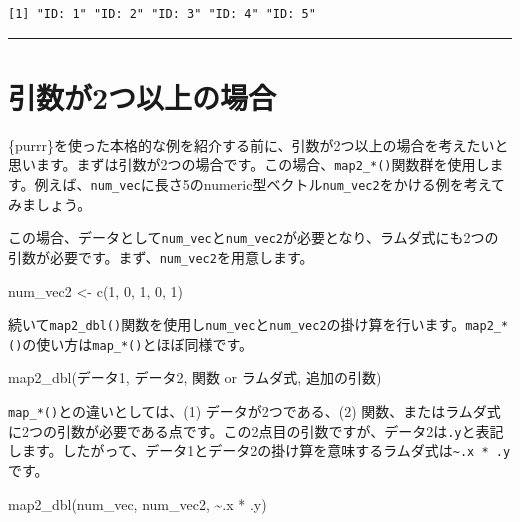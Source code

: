 \documentclass[
  a4paper,
  pandoc,
  ja=standard,
  jafont=haranoaji]{bxjsbook}
\newenvironment{Shaded}{\begin{snugshade}}{\end{snugshade}}
\newcommand{\DecValTok}[1]{\textcolor[rgb]{0.68,0.00,0.00}{#1}}
\newcommand{\FunctionTok}[1]{\textcolor[rgb]{0.28,0.35,0.67}{#1}}
\newcommand{\NormalTok}[1]{\textcolor[rgb]{0.00,0.48,0.65}{#1}}
\newcommand{\OtherTok}[1]{\textcolor[rgb]{0.00,0.48,0.65}{#1}}
\newcommand{\SpecialCharTok}[1]{\textcolor[rgb]{0.37,0.37,0.37}{#1}}
\begin{document}
\begin{verbatim}
[1] "ID: 1" "ID: 2" "ID: 3" "ID: 4" "ID: 5"
\end{verbatim}

\begin{center}\rule{0.5\linewidth}{0.5pt}\end{center}

\hypertarget{sec-iteration_two_arguments}{%
\section{引数が2つ以上の場合}\label{sec-iteration_two_arguments}}

\{purrr\}を使った本格的な例を紹介する前に、引数が2つ以上の場合を考えたいと思います。まずは引数が2つの場合です。この場合、\texttt{map2\_*()}関数群を使用します。例えば、\texttt{num\_vec}に長さ5のnumeric型ベクトル\texttt{num\_vec2}をかける例を考えてみましょう。

この場合、データとして\texttt{num\_vec}と\texttt{num\_vec2}が必要となり、ラムダ式にも2つの引数が必要です。まず、\texttt{num\_vec2}を用意します。

\begin{Shaded}
\begin{Highlighting}[numbers=left,,]
\NormalTok{num\_vec2 }\OtherTok{\textless{}{-}} \FunctionTok{c}\NormalTok{(}\DecValTok{1}\NormalTok{, }\DecValTok{0}\NormalTok{, }\DecValTok{1}\NormalTok{, }\DecValTok{0}\NormalTok{, }\DecValTok{1}\NormalTok{)}
\end{Highlighting}
\end{Shaded}

続いて\texttt{map2\_dbl()}関数を使用し\texttt{num\_vec}と\texttt{num\_vec2}の掛け算を行います。\texttt{map2\_*()}の使い方は\texttt{map\_*()}とほぼ同様です。

\begin{Shaded}
\begin{Highlighting}[numbers=left,,]
\FunctionTok{map2\_dbl}\NormalTok{(データ1, データ2, 関数 or ラムダ式, 追加の引数)}
\end{Highlighting}
\end{Shaded}

\texttt{map\_*()}との違いとしては、(1) データが2つである、(2)
関数、またはラムダ式に2つの引数が必要である点です。この2点目の引数ですが、データ2は\texttt{.y}と表記します。したがって、データ1とデータ2の掛け算を意味するラムダ式は\texttt{\textasciitilde{}.x\ *\ .y}です。

\begin{Shaded}
\begin{Highlighting}[numbers=left,,]
\FunctionTok{map2\_dbl}\NormalTok{(num\_vec, num\_vec2, }\SpecialCharTok{\textasciitilde{}}\NormalTok{.x }\SpecialCharTok{*}\NormalTok{ .y)}
\end{Highlighting}
\end{Shaded}
\end{document}
